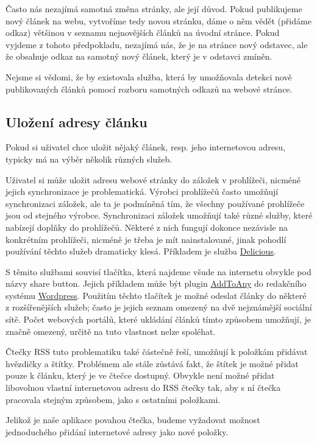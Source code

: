 Často nás nezajímá samotná změna stránky, ale její důvod.
Pokud publikujeme nový článek na webu, vytvoříme tedy novou stránku, dáme o něm vědět (přidáme odkaz) většinou v seznamu nejnovějších článků na úvodní stránce.
Pokud vyjdeme z tohoto předpokladu, nezajímá nás, že je na stránce nový odstavec, ale že obsahuje odkaz na samotný nový článek, který je v odstavci zmíněn.

Nejsme si vědomi, že by existovala služba, která by umožňovala detekci nově publikovaných článků pomocí rozboru samotných odkazů na webové stránce.

\subsection{Uložení adresy článku}

Pokud si uživatel chce uložit nějaký článek, resp. jeho internetovou adresu, typicky má na výběr několik různých služeb.

Uživatel si může uložit adresu webové stránky do záložek v prohlížeči, nicméně jejich synchronizace je problematická.
Výrobci prohlížečů často umožňují synchronizaci záložek, ale ta je podmíněná tím, že všechny používané prohlížeče jsou od stejného výrobce.
Synchronizaci záložek umožňují také různé služby, které nabízejí doplňky do prohlížečů.
Některé z nich fungují dokonce nezávisle na konkrétním prohlížeči, nicméně je třeba je mít nainstalované, jinak pohodlí používání těchto služeb dramaticky klesá.
Příkladem je služba \href{https://delicious.com/}{Delicious}.

S těmito službami souvisí tlačítka, která najdeme všude na internetu obvykle pod názvy share button.
Jejich příkladem může být plugin \href{http://wordpress.org/plugins/add-to-any/}{AddToAny} do redakčního systému \href{http://wordpress.org/}{Wordpress}.
Použitím těchto tlačítek je možné odeslat články do některé z rozšířenějších služeb; často je jejich seznam omezený na dvě nejznámější sociální sítě.
Počet webových portálů, které ukládání článků tímto způsobem umožňují, je značně omezený, určitě na tuto vlastnost nelze spoléhat.

Čtečky RSS tuto problematiku také částečně řeší, umožňují k položkám přidávat hvězdičky a štítky.
Problémem ale stále zůstává fakt, že štítek je možné přidat pouze k článku, který je ve čtečce dostupný.
Obvykle není možné přidat libovolnou vlastní internetovou adresu do RSS čtečky tak, aby s ní čtečka pracovala stejným způsobem, jako s ostatními položkami.

Jelikož je naše aplikace povahou čtečka, budeme vyžadovat možnost jednoduchého přidání internetové adresy jako nové položky.

